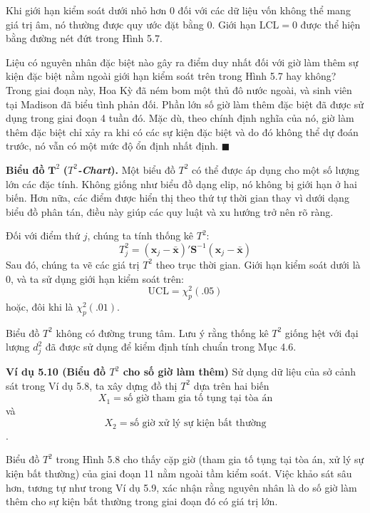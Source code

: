 Khi giới hạn kiểm soát dưới nhỏ hơn 0 đối với các dữ liệu vốn không thể mang giá trị âm, nó thường được quy ước đặt bằng 0. Giới hạn $\text{LCL} = 0$ được thể hiện bằng đường nét đứt trong Hình 5.7.

Liệu có nguyên nhân đặc biệt nào gây ra điểm duy nhất đối với giờ làm thêm sự kiện đặc biệt nằm ngoài giới hạn kiểm soát trên trong Hình 5.7 hay không? Trong giai đoạn này, Hoa Kỳ đã ném bom một thủ đô nước ngoài, và sinh viên tại Madison đã biểu tình phản đối. Phần lớn số giờ làm thêm đặc biệt đã được sử dụng trong giai đoạn 4 tuần đó. Mặc dù, theo chính định nghĩa của nó, giờ làm thêm đặc biệt chỉ xảy ra khi có các sự kiện đặc biệt và do đó không thể dự đoán trước, nó vẫn có một mức độ ổn định nhất định. \hfill $\blacksquare$

\vspace{0.4em}
\noindent\textbf{Biểu đồ} $\boldsymbol{T}^2$ \textbf{(\textit{$T^2$-Chart}).} Một biểu đồ $T^2$ có thể được áp dụng cho một số lượng lớn các đặc tính. Không giống như biểu đồ dạng elip, nó không bị giới hạn ở hai biến. Hơn nữa, các điểm được hiển thị theo thứ tự thời gian thay vì dưới dạng biểu đồ phân tán, điều này giúp các quy luật và xu hướng trở nên rõ ràng.

Đối với điểm thứ $j$, chúng ta tính thống kê $T^2$:
\begin{equation}
T_j^2 = (\mathbf{x}_j - \bar{\mathbf{x}})'\mathbf{S}^{-1}(\mathbf{x}_j - \bar{\mathbf{x}}) \tag{5-33}
\end{equation}
Sau đó, chúng ta vẽ các giá trị $T^2$ theo trục thời gian. Giới hạn kiểm soát dưới là 0, và ta sử dụng giới hạn kiểm soát trên:
\[
\text{UCL} = \chi_p^2(.05)
\]
hoặc, đôi khi là $\chi_p^2(.01)$.

Biểu đồ $T^2$ không có đường trung tâm. Lưu ý rằng thống kê $T^2$ giống hệt với đại lượng $d_j^2$ đã được sử dụng để kiểm định tính chuẩn trong Mục 4.6.


\vspace{0.3cm}
\noindent\textbf{Ví dụ 5.10 (Biểu đồ $T^2$ cho số giờ làm thêm)} Sử dụng dữ liệu của sở cảnh sát trong Ví dụ 5.8, ta xây dựng đồ thị $T^2$ dựa trên hai biến \[X_1 = \text{số giờ tham gia tố tụng tại tòa án}\] và \[X_2 = \text{số giờ xử lý sự kiện bất thường}\].

Biểu đồ $T^2$ trong Hình 5.8 cho thấy cặp giờ (tham gia tố tụng tại tòa án, xử lý sự kiện bất thường) của giai đoạn 11 nằm ngoài tầm kiểm soát. Việc khảo sát sâu hơn, tương tự như trong Ví dụ 5.9, xác nhận rằng nguyên nhân là do số giờ làm thêm cho sự kiện bất thường trong giai đoạn đó có giá trị lớn.


